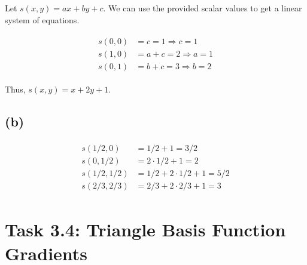 \documentclass[paper=a4, fontsize=11pt]{scrartcl} %
\numberwithin{equation}{section} %
\numberwithin{figure}{section} %
\numberwithin{table}{section} %
\begin{document}
Let $s(x, y) = ax + by + c$. We can use the provided scalar values to get a
linear system of equations.

\begin{align*}
  \begin{split}
    s(0, 0) &= c = 1 \Rightarrow c = 1\\
    s(1, 0) &= a + c = 2 \Rightarrow a = 1\\
    s(0, 1) &= b + c = 3 \Rightarrow b = 2
  \end{split}
\end{align*}

Thus, $s(x, y) = x + 2y + 1$.

\subsection*{(b)}

\begin{align*}
  \begin{split}
    s(1/2, 0) &= 1/2 + 1 = 3/2\\
    s(0, 1/2) &= 2 \cdot 1/2 + 1 = 2\\
    s(1/2, 1/2) &= 1/2 + 2 \cdot 1/2 + 1 = 5/2\\
    s(2/3, 2/3) &= 2/3 + 2 \cdot 2/3 + 1 = 3
  \end{split}
\end{align*}

\section*{Task 3.4: Triangle Basis Function Gradients}
\end{document}
